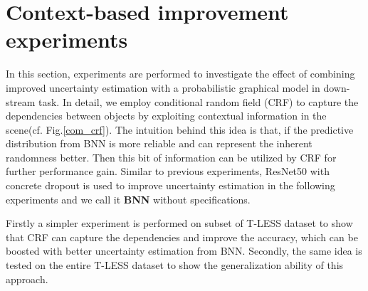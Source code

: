 %


\section{Context-based improvement experiments}
In this section, experiments are performed to investigate the effect of combining improved uncertainty estimation with a probabilistic graphical model in down-stream task. In detail, we employ conditional random field (CRF) to capture the dependencies between objects by exploiting contextual information in the scene(cf. Fig.\ref{com_crf}). The intuition behind this idea is that, if the predictive distribution from BNN is more reliable and can represent the inherent randomness better. Then this bit of information can be utilized by CRF for further performance gain. Similar to previous experiments, ResNet50 with concrete dropout is used to improve uncertainty estimation in the following experiments and we call it \textbf{BNN} without specifications. 

Firstly a simpler experiment is performed on subset of T-LESS dataset to show that CRF can capture the dependencies and improve the accuracy, which can be boosted with better uncertainty estimation from BNN. Secondly, the same idea is tested on the entire T-LESS dataset to show the generalization ability of this approach. 


